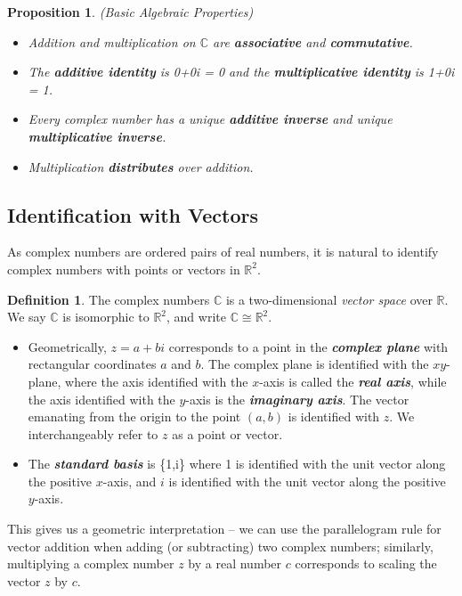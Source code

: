 \documentclass[12pt]{article}
\theoremstyle{plain}
\newtheorem{prop}[thm]{Proposition}
\theoremstyle{definition}
\newtheorem{defn}[thm]{Definition}
\begin{document}
\begin{prop}
(Basic Algebraic Properties) 
\begin{itemize}
    \item Addition and multiplication on $\mathbb{C}$ are \textbf{associative} and \textbf{commutative}.
    \item The \textbf{additive identity} is 0+0i = 0 and the \textbf{multiplicative identity} is 1+0i = 1.
    \item Every complex number has a unique \textbf{additive inverse} and unique \textbf{multiplicative inverse}.
    \item Multiplication \textbf{distributes} over addition.
\end{itemize}

\end{prop}

\subsection{Identification with Vectors}
\label{compIden}
As complex numbers are ordered pairs of real numbers, it is natural to identify complex numbers with points or vectors in $\mathbb{R}^2$.

\begin{defn} \label{compDefnVec}
The complex numbers $\mathbb{C}$ is a two-dimensional \textit{vector space} over $\mathbb{R}$. We say $\mathbb{C}$ is isomorphic to $\mathbb{R}^2$, and write $\mathbb{C}\cong \mathbb{R}^2$.
\begin{itemize}
    \item Geometrically, $z=a+bi$ corresponds to a point in the \textbf{\textit{complex plane}} with rectangular coordinates $a$ and $b$. The complex plane is identified with the $xy$-plane, where the axis identified with the $x$-axis is called the \textbf{\textit{real axis}}, while the axis identified with the $y$-axis is the \textbf{\textit{imaginary axis}}. The vector emanating from the origin to the point $(a,b)$ is identified with $z$. We interchangeably refer to $z$ as a point or vector.
    \item The \textbf{\textit{standard basis}} is \{1,i\} where 1 is identified with the unit vector along the positive $x$-axis, and $i$ is identified with the unit vector along the positive $y$-axis.
\end{itemize}
\end{defn}

This gives us a geometric interpretation -- we can use the parallelogram rule for vector addition when adding (or subtracting) two complex numbers; similarly, multiplying a complex number $z$ by a real number $c$ corresponds to scaling the vector $z$ by $c$.
\end{document}
